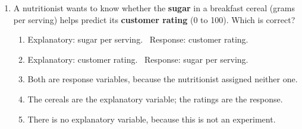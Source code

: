 \documentclass[12pt]{article}
\begin{document}
\begin{enumerate}[leftmargin=1.9em, itemsep=0.13in]
  \boxguard[9]
  \item A nutritionist wants to know whether the \textbf{sugar} in a breakfast cereal (grams per
        serving) helps predict its \textbf{customer rating} (0 to 100). Which is correct?
        \begin{enumerate}[label=\textbf{(\Alph*)}, leftmargin=2.2em, itemsep=2pt]
          \item Explanatory: sugar per serving. \ Response: customer rating.
          \item Explanatory: customer rating. \ Response: sugar per serving.
          \item Both are response variables, because the nutritionist assigned neither one.
          \item The cereals are the explanatory variable; the ratings are the response.
          \item There is no explanatory variable, because this is not an experiment.\hfill{}\rule[-0.2in]{0pt}{0.48in}
        \end{enumerate}


\end{enumerate}
\end{document}
